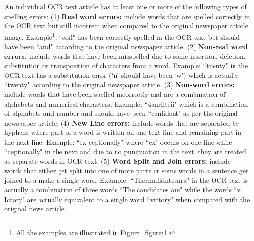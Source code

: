 \documentclass[preprint,11pt]{elsarticle}
\begin{document}
\noindent An individual OCR text article has at least one or more of the following types of spelling errors: (1) \textbf{Real word errors: }include words that are spelled correctly in the OCR text but still incorrect when compared to the original newspaper article image. Example\footnote{All the examples are illustrated in Figure~\ref{figure:1}}: ``coil"  has been correctly spelled in the OCR text  but should have been ``and" according to the original newspaper article. (2) \textbf{Non-real word errors: }include words that have been misspelled due to some insertion, deletion, substitution or transposition of characters from a word. Example: ``tnenty" in the OCR text has a substitution error (`n' should have been `w') which is actually ``twenty" according to the original newspaper article. (3) \textbf{Non-word errors: }include words that have been spelled incorrectly and are a combination of alphabets and numerical characters. Example:  ``4anrliteii" which is a combination of alphabets and number and should have been ``confident" as per the original newspaper article. (4) \textbf{New Line errors: }include words that are separated by hyphens where part of a word is written on one text line and remaining part in the next line. Example: ``ex-ceptionally" where ``ex" occurs on one line while ``ceptionally" in the next and due to no punctuation in the text, they are treated as separate words in OCR text. (5) \textbf{Word Split and Join errors: }include words that either get split into one of more parts or some words in a sentence get joined to a make a single word. Example: ``Thernndldntesnra" in the OCR text is actually a combination of three words ``The candidates are" while the words ``v Icrory" are actually equivalent to a single word ``victory" when compared with the original news article.
\end{document}
